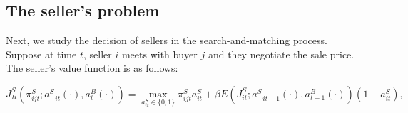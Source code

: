 \subsection{The seller's problem}

Next, we study the decision of sellers in the search-and-matching process. Suppose at time $t$, seller $i$ meets with buyer $j$ and they negotiate the sale price. The seller's value function is as follows:

\begin{equation}
    J_R^S(\pi_{ijt}^S; a_{-it}^S(\cdot), a_t^B(\cdot)) = \max_{a_{it}^S \in \{0, 1\}} \pi_{ijt}^S a_{it}^S + \beta E(J_{it}^S; a_{-it + 1}^S(\cdot), a_{t + 1}^B(\cdot))(1 - a_{it}^S),
\end{equation}